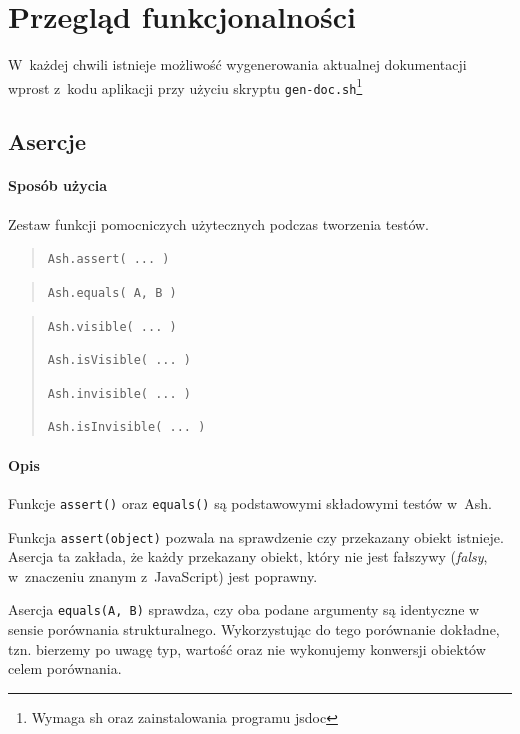 \documentclass{xmgr}
\begin{document}
\chapter{Przegląd funkcjonalności}

W~każdej chwili istnieje możliwość wygenerowania aktualnej dokumentacji wprost z~kodu aplikacji przy użyciu skryptu \texttt{gen-doc.sh}\footnote{Wymaga sh oraz zainstalowania programu jsdoc}

\section{Asercje}

\subsubsection{Sposób użycia}

Zestaw funkcji pomocniczych użytecznych podczas tworzenia testów.

\begin{quote}
  \texttt{Ash.assert( ... )} 
\end{quote}

\begin{quote}
  \texttt{Ash.equals( A, B )} 
\end{quote}

\begin{quote}
  \texttt{Ash.visible( ... )} 

  \texttt{Ash.isVisible( ... )}

  \texttt{Ash.invisible( ... )}

  \texttt{Ash.isInvisible( ... )}
\end{quote}

\subsubsection{Opis}

Funkcje \texttt{assert()} oraz \texttt{equals()} są podstawowymi składowymi testów w~Ash.

Funkcja \texttt{assert(object)} pozwala na sprawdzenie czy przekazany obiekt istnieje. Asercja ta zakłada, że każdy przekazany obiekt, który nie jest fałszywy (\textit{falsy}, w~znaczeniu znanym z~JavaScript) jest poprawny. 

Asercja \texttt{equals(A, B)} sprawdza, czy oba podane argumenty są identyczne w sensie porównania strukturalnego. Wykorzystując do tego porównanie dokładne, tzn. bierzemy po uwagę typ, wartość oraz nie wykonujemy konwersji obiektów celem porównania.
\end{document}
